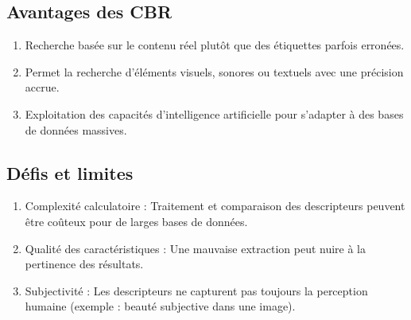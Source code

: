 \begin{section}
\section{Avantages des CBR}
\begin{enumerate}
    \item Recherche basée sur le contenu réel plutôt que des étiquettes parfois erronées.
    \item Permet la recherche d'éléments visuels, sonores ou textuels avec une précision accrue.
    \item Exploitation des capacités d’intelligence artificielle pour s’adapter à des bases de données massives.
\end{enumerate}

\section{Défis et limites}
\begin{enumerate}
    \item Complexité calculatoire : Traitement et comparaison des descripteurs peuvent être coûteux pour de larges bases de données.
    \item Qualité des caractéristiques : Une mauvaise extraction peut nuire à la pertinence des résultats.
    \item Subjectivité : Les descripteurs ne capturent pas toujours la perception humaine (exemple : beauté subjective dans une image).
\end{enumerate}

\end{section}